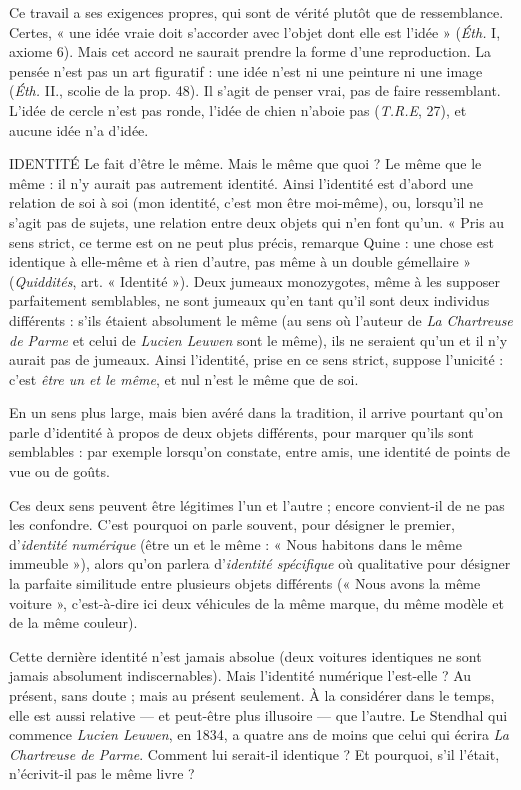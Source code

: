 Ce travail a ses exigences propres, qui sont de vérité plutôt que de ressemblance.
Certes, « une idée vraie doit s’accorder avec l’objet dont elle est l’idée »
({\it Éth.} I, axiome 6). Mais cet accord ne saurait prendre la forme d’une reproduction.
La pensée n’est pas un art figuratif : une idée n’est ni une peinture ni une
image ({\it Éth.} II., scolie de la prop. 48). Il s’agit de penser vrai, pas de faire ressemblant.
L'idée de cercle n’est pas ronde, l’idée de chien n’aboie pas ({\it T.R.E},
27), et aucune idée n’a d’idée.

IDENTITÉ Le fait d’être le même. Mais le même que quoi ? Le même que
le même : il n’y aurait pas autrement identité. Ainsi l’identité
est d’abord une relation de soi à soi (mon identité, c’est mon être moi-même),
ou, lorsqu'il ne s’agit pas de sujets, une relation entre deux objets qui n’en font
qu'un. « Pris au sens strict, ce terme est on ne peut plus précis, remarque
Quine : une chose est identique à elle-même et à rien d’autre, pas même à un
double gémellaire » ({\it Quiddités}, art. « Identité »). Deux jumeaux monozygotes,
même à les supposer parfaitement semblables, ne sont jumeaux qu’en tant qu’il
sont deux individus différents : s’ils étaient absolument le même (au sens où
l’auteur de {\it La Chartreuse de Parme} et celui de {\it Lucien Leuwen} sont le même), ils
ne seraient qu’un et il n’y aurait pas de jumeaux. Ainsi l'identité, prise en ce
sens strict, suppose l’unicité : c’est {\it être un et le même}, et nul n’est le même que
de soi.

En un sens plus large, mais bien avéré dans la tradition, il arrive pourtant
qu’on parle d'identité à propos de deux objets différents, pour marquer qu’ils
sont semblables : par exemple lorsqu'on constate, entre amis, une identité de
points de vue ou de goûts.

Ces deux sens peuvent être légitimes l’un et l’autre ; encore convient-il
de ne pas les confondre. C’est pourquoi on parle souvent, pour désigner le
premier, d'{\it identité numérique} (être un et le même : « Nous habitons dans le
même immeuble »), alors qu’on parlera d'{\it identité spécifique} où qualitative pour
désigner la parfaite similitude entre plusieurs objets différents (« Nous avons la
même voiture », c’est-à-dire ici deux véhicules de la même marque, du même
modèle et de la même couleur).

Cette dernière identité n’est jamais absolue (deux voitures identiques ne
sont jamais absolument indiscernables). Mais l'identité numérique l’est-elle ?
Au présent, sans doute ; mais au présent seulement. À la considérer dans le
temps, elle est aussi relative — et peut-être plus illusoire — que l’autre. Le
Stendhal qui commence {\it Lucien Leuwen}, en 1834, a quatre ans de moins que
celui qui écrira {\it La Chartreuse de Parme}. Comment lui serait-il identique ? Et
pourquoi, s’il l'était, n’écrivit-il pas le même livre ?

